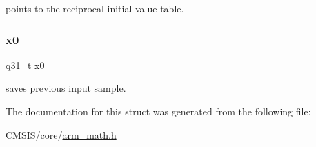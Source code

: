 points to the reciprocal initial value table. \mbox{\label{structarm__lms__norm__instance__q31_a973b8350a0c7b113a5f002bc0b86bf76}} 
\subsubsection{\texorpdfstring{x0}{x0}}
{\footnotesize\ttfamily \mbox{\hyperlink{arm__math_8h_adc89a3547f5324b7b3b95adec3806bc0}{q31\+\_\+t}} x0}

saves previous input sample. 

The documentation for this struct was generated from the following file\+:\begin{DoxyCompactItemize}
\item 
C\+M\+S\+I\+S/core/\mbox{\hyperlink{arm__math_8h}{arm\+\_\+math.\+h}}\end{DoxyCompactItemize}
